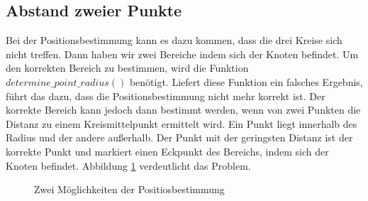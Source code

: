 \subsection{Abstand zweier Punkte}
Bei der Positionsbestimmung kann es dazu kommen, dass die drei Kreise sich nicht treffen. Dann haben wir zwei Bereiche indem sich der Knoten befindet. Um den korrekten Bereich zu bestimmen, wird die Funktion $determine\_point\_radius()$ benötigt. Liefert diese Funktion ein falsches Ergebnis, führt das dazu, dass die Positionsbestimmung nicht mehr korrekt ist. Der korrekte Bereich kann jedoch dann bestimmt werden, wenn von zwei Punkten die Distanz zu einem Kreismittelpunkt ermittelt wird. Ein Punkt liegt innerhalb des Radius und der andere außerhalb. Der Punkt mit der geringsten Distanz ist der korrekte Punkt und markiert einen Eckpunkt des Bereichs, indem sich der Knoten befindet. Abbildung \ref{img:figure_abstand_zweier_punkte} verdeutlicht das Problem.

\begin{figure}[H]
	\hspace*{-2.0cm}
	\caption{Zwei Möglichkeiten der Positiosbestimmung}
	\label{img:figure_abstand_zweier_punkte}
\end{figure}

